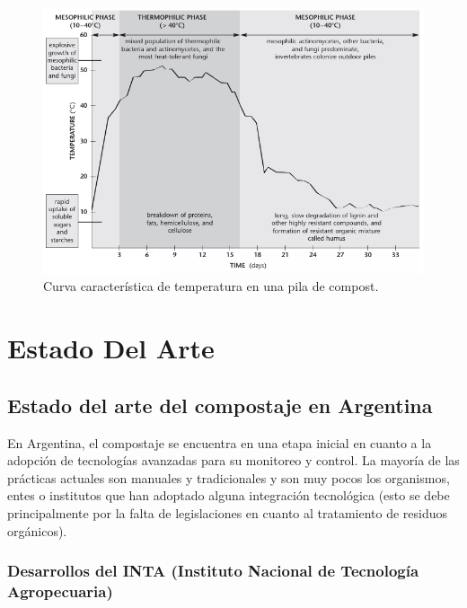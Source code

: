  \begin{figure}[H]
	\centering
	\includegraphics[scale=.7]{Figures/Compost Caracteristicas/Curva Temperatura.PNG}
	\caption{Curva característica de temperatura en una pila de compost.}
	\label{fig:curvatemp}
\end{figure}




\section{Estado Del Arte} %


\subsection{Estado del arte del compostaje en Argentina}
\label{sec:EstadoArteArgentina}

En Argentina, el compostaje se encuentra en una etapa inicial en cuanto a la adopción de tecnologías avanzadas para su monitoreo y control. La mayoría de las prácticas actuales son manuales y tradicionales y son muy pocos los organismos, entes o institutos que han adoptado alguna integración tecnológica (esto se debe principalmente por la falta de legislaciones en cuanto al tratamiento de residuos orgánicos).

\subsubsection{Desarrollos del INTA (Instituto Nacional de Tecnología Agropecuaria)}

